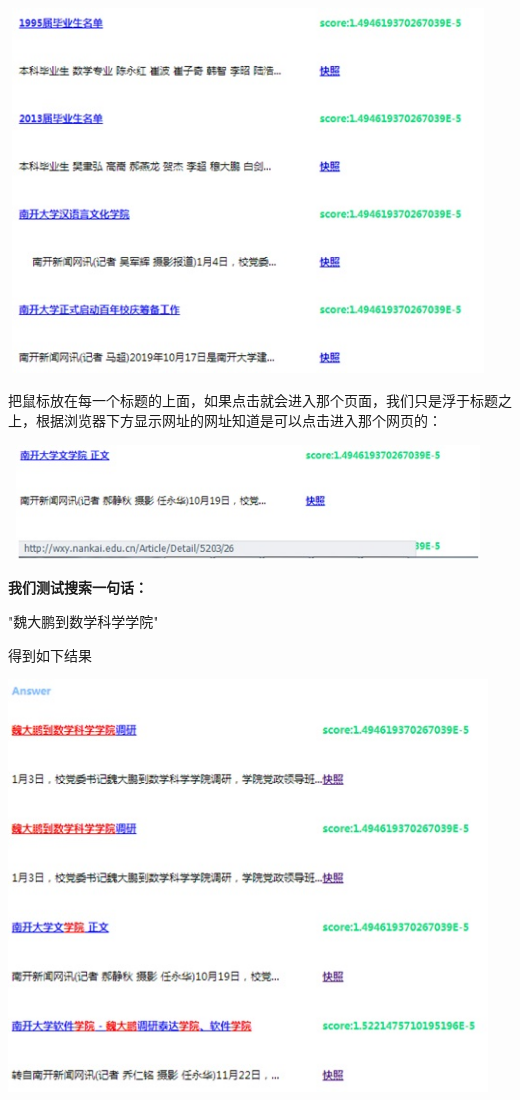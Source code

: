 ﻿\documentclass[UTF8]{ctexart}
\begin{document}
\begin{flushleft}
\par{}
\includegraphics[width=5.00in,height=3.80in]{figure9.jpg}
\par{}
    把鼠标放在每一个标题的上面，如果点击就会进入那个页面，我们只是浮于标题之上，根据浏览器下方显示网址的网址知道是可以点击进入那个网页的：
\par{}
\includegraphics[width=5.00in,height=1.20in]{figure10.jpg}
\par{}
\textbf{我们测试搜索一句话：}
\par{}
"魏大鹏到数学科学学院"
\par{}
得到如下结果
\par{}
\includegraphics[width=5.00in,height=4.30in]{figure13.jpg}

\end{flushleft}
\end{document}
